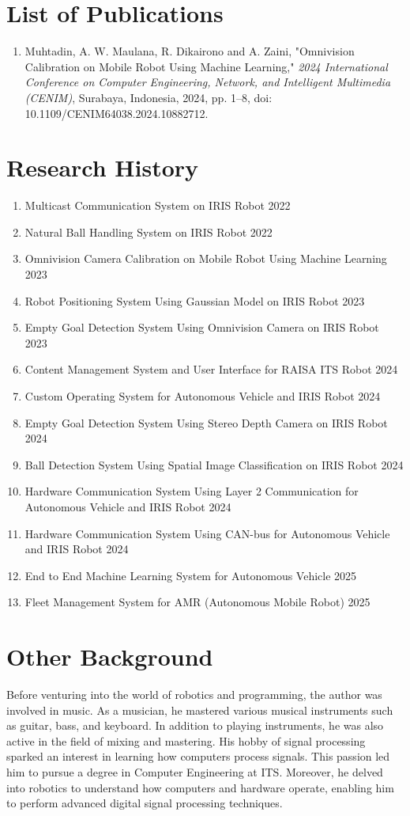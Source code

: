 \section*{List of Publications}
\begin{enumerate}
    \item Muhtadin, A. W. Maulana, R. Dikairono and A. Zaini, "Omnivision Calibration on Mobile Robot Using Machine Learning," \textit{2024 International Conference on Computer Engineering, Network, and Intelligent Multimedia (CENIM)}, Surabaya, Indonesia, 2024, pp. 1–8, doi: 10.1109/CENIM64038.2024.10882712.
\end{enumerate}

\section*{Research History}
\begin{enumerate}
    \item Multicast Communication System on IRIS Robot 2022
    \item Natural Ball Handling System on IRIS Robot 2022
    \item Omnivision Camera Calibration on Mobile Robot Using Machine Learning 2023
    \item Robot Positioning System Using Gaussian Model on IRIS Robot 2023
    \item Empty Goal Detection System Using Omnivision Camera on IRIS Robot 2023
    \item Content Management System and User Interface for RAISA ITS Robot 2024
    \item Custom Operating System for Autonomous Vehicle and IRIS Robot 2024
    \item Empty Goal Detection System Using Stereo Depth Camera on IRIS Robot 2024
    \item Ball Detection System Using Spatial Image Classification on IRIS Robot 2024
    \item Hardware Communication System Using Layer 2 Communication for Autonomous Vehicle and IRIS Robot 2024
    \item Hardware Communication System Using CAN-bus for Autonomous Vehicle and IRIS Robot 2024
    \item End to End Machine Learning System for Autonomous Vehicle 2025
    \item Fleet Management System for AMR (Autonomous Mobile Robot) 2025
\end{enumerate}

\section*{Other Background}
Before venturing into the world of robotics and programming, the author was involved in music. As a musician, he mastered various musical instruments such as guitar, bass, and keyboard. In addition to playing instruments, he was also active in the field of mixing and mastering. His hobby of signal processing sparked an interest in learning how computers process signals. This passion led him to pursue a degree in Computer Engineering at ITS. Moreover, he delved into robotics to understand how computers and hardware operate, enabling him to perform advanced digital signal processing techniques.
